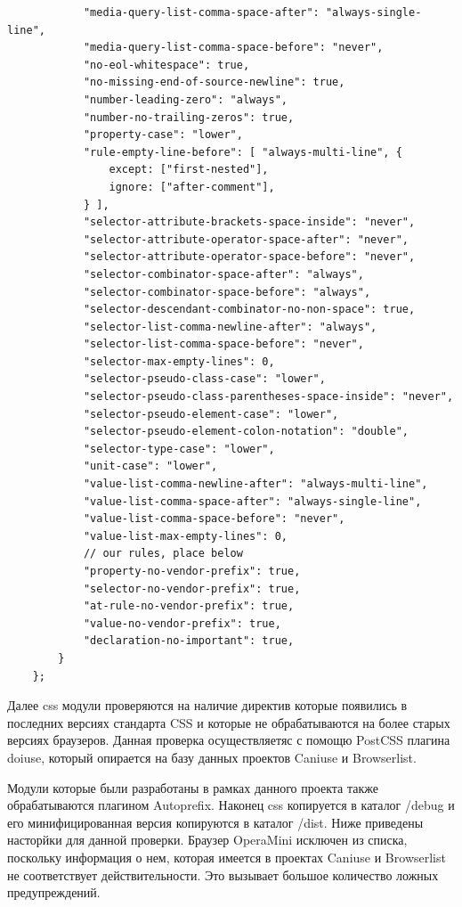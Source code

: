 \begin{small}
\begin{verbatim}
            "media-query-list-comma-space-after": "always-single-line",
            "media-query-list-comma-space-before": "never",
            "no-eol-whitespace": true,
            "no-missing-end-of-source-newline": true,
            "number-leading-zero": "always",
            "number-no-trailing-zeros": true,
            "property-case": "lower",
            "rule-empty-line-before": [ "always-multi-line", {
                except: ["first-nested"],
                ignore: ["after-comment"],
            } ],
            "selector-attribute-brackets-space-inside": "never",
            "selector-attribute-operator-space-after": "never",
            "selector-attribute-operator-space-before": "never",
            "selector-combinator-space-after": "always",
            "selector-combinator-space-before": "always",
            "selector-descendant-combinator-no-non-space": true,
            "selector-list-comma-newline-after": "always",
            "selector-list-comma-space-before": "never",
            "selector-max-empty-lines": 0,
            "selector-pseudo-class-case": "lower",
            "selector-pseudo-class-parentheses-space-inside": "never",
            "selector-pseudo-element-case": "lower",
            "selector-pseudo-element-colon-notation": "double",
            "selector-type-case": "lower",
            "unit-case": "lower",
            "value-list-comma-newline-after": "always-multi-line",
            "value-list-comma-space-after": "always-single-line",
            "value-list-comma-space-before": "never",
            "value-list-max-empty-lines": 0,
            // our rules, place below
            "property-no-vendor-prefix": true,
            "selector-no-vendor-prefix": true,
            "at-rule-no-vendor-prefix": true,
            "value-no-vendor-prefix": true,
            "declaration-no-important": true,
        }
    };
\end{verbatim}
\end{small}

 Далее css модули проверяются на наличие директив которые появились в последних версиях стандарта CSS и которые не обрабатываются на более старых версиях браузеров. Данная проверка осуществляетяс с помощю PostCSS плагина doiuse, который опирается на базу данных проектов Caniuse и Browserlist. 
 
 
Модули которые были разработаны в рамках данного проекта также обрабатываются плагином Autoprefix. Наконец css копируется в каталог /debug и его минифицированная версия копируются в каталог /dist. Ниже приведены насторйки для данной проверки. Браузер OperaMini исключен из списка, поскольку информация о нем, которая имеется в проектах Caniuse и Browserlist не соответствует действительности. Это вызывает большое количество ложных предупреждений.  


